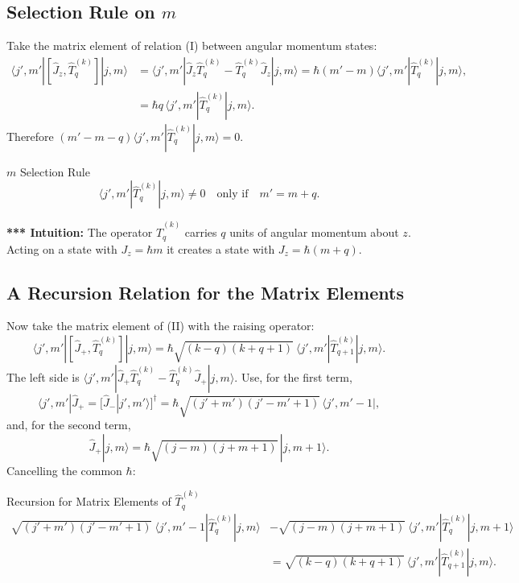 \documentclass[11pt,a4paper]{article}
\begin{document}
\subsection{Selection Rule on \texorpdfstring{$m$}{m}}
Take the matrix element of relation (I) between angular momentum states:
\begin{align*}
\langle j',m'|[\hat J_z,\hat T^{(k)}_q]|j,m\rangle&=\langle j',m'|\hat J_z\hat T^{(k)}_q-\hat T^{(k)}_q\hat J_z|j,m\rangle=\hbar(m'-m)\langle j',m'|\hat T^{(k)}_q|j,m\rangle,\\
&=\hbar q\,\langle j',m'|\hat T^{(k)}_q|j,m\rangle .
\end{align*}
Therefore $(m'-m-q)\langle j',m'|\hat T^{(k)}_q|j,m\rangle=0$.

\begin{thm}{$m$ Selection Rule}
\[
\langle j',m'|\hat T^{(k)}_q|j,m\rangle\neq0\quad\text{only if}\quad m'=m+q .
\]
\end{thm}

\textbf{*** Intuition:} The operator $\hat T^{(k)}_q$ carries $q$ units of angular momentum about $z$. Acting on a state with $J_z=\hbar m$ it creates a state with $J_z=\hbar(m+q)$.

\subsection{A Recursion Relation for the Matrix Elements}
Now take the matrix element of (II) with the raising operator:
\[
\langle j',m'|[\hat J_+,\hat T^{(k)}_q]|j,m\rangle=\hbar\sqrt{(k-q)(k+q+1)}\ \langle j',m'|\hat T^{(k)}_{q+1}|j,m\rangle .
\]
The left side is $\langle j',m'|\hat J_+\hat T^{(k)}_q-\hat T^{(k)}_q\hat J_+|j,m\rangle$. Use, for the first term,
\[
\langle j',m'|\hat J_+=\big[\hat J_-|j',m'\rangle\big]^\dagger=\hbar\sqrt{(j'+m')(j'-m'+1)}\,\langle j',m'-1|,
\]
and, for the second term,
\[
\hat J_+|j,m\rangle=\hbar\sqrt{(j-m)(j+m+1)}\,|j,m+1\rangle .
\]
Cancelling the common $\hbar$:

\begin{thm}{Recursion for Matrix Elements of $\hat T^{(k)}_q$}
\begin{align*}
\sqrt{(j'+m')(j'-m'+1)}\ \langle j',m'-1|\hat T^{(k)}_q|j,m\rangle&-\sqrt{(j-m)(j+m+1)}\ \langle j',m'|\hat T^{(k)}_q|j,m+1\rangle\\
&=\sqrt{(k-q)(k+q+1)}\ \langle j',m'|\hat T^{(k)}_{q+1}|j,m\rangle .\tag{A}
\end{align*}
\end{thm}
\end{document}
